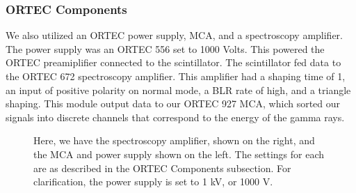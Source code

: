 \documentclass[10pt,letterpaper,onecolumn]{article}
\begin{document}
\subsubsection*{ORTEC Components}
We also utilized an ORTEC power supply, MCA, and a spectroscopy amplifier. The power supply was an ORTEC 556 set to 1000 Volts. This powered the ORTEC preamiplifier connected to the scintillator. The scintillator fed data to the ORTEC 672 spectroscopy amplifier. This amplifier had a shaping time of 1, an input of positive polarity on normal mode, a BLR rate of high, and a triangle shaping. This module output data to our ORTEC 927 MCA, which sorted our signals into discrete channels that correspond to the energy of the gamma rays.
\begin{figure}
    \begin{center}
        \qquad
        \caption{Here, we have the spectroscopy amplifier, shown on the right, and the MCA and power supply shown on the left. The settings for each are as described in the ORTEC Components subsection. For clarification, the power supply is set to 1 kV, or 1000 V.}%
        \label{fig:example}%
    \end{center}
\end{figure}
\end{document}
